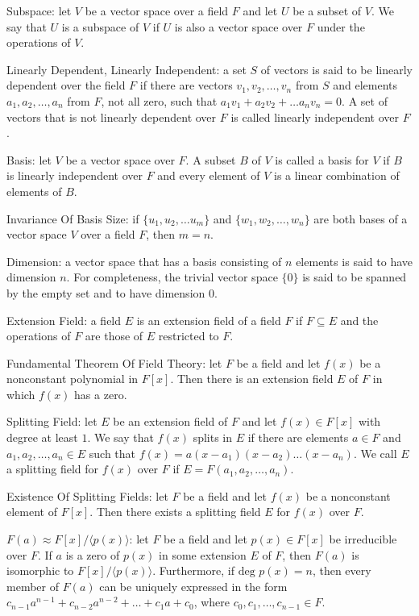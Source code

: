 Subspace: let $V$ be a vector space over a field $F$ and let $U$ be a subset of $V$. We say that $U$ is a subspace of $V$ if $U$ is also a vector space over $F$ under the operations of $V$.

Linearly Dependent, Linearly Independent: a set $S$ of vectors is said to be linearly dependent over the field $F$ if there are vectors $v_1,v_2,\dots,v_n$ from $S$ and elements $a_1,a_2,\dots,a_n$ from $F$, not all zero, such that $a_1 v_1 + a_2 v_2 + \dots a_n v_n = 0$. A set of vectors that is not linearly dependent over $F$ is called linearly independent over $F$.

Basis: let $V$ be a vector space over $F$. A subset $B$ of $V$ is called a basis for $V$ if $B$ is linearly independent over $F$ and every element of $V$ is a linear combination of elements of $B$.

Invariance Of Basis Size: if $\{ u_1,u_2,\dots u_m \}$ and $\{ w_1,w_2,\dots,w_n \}$ are both bases of a vector space $V$ over a field $F$, then $m=n$.

Dimension: a vector space that has a basis consisting of $n$ elements is said to have dimension $n$. For completeness, the trivial vector space $\{ 0 \}$ is said to be spanned by the empty set and to have dimension $0$.

Extension Field: a field $E$ is an extension field of a field $F$ if $F \subseteq E$ and the operations of $F$ are those of $E$ restricted to $F$.

Fundamental Theorem Of Field Theory: let $F$ be a field and let $f(x)$ be a nonconstant polynomial in $F[x]$. Then there is an extension field $E$ of $F$ in which $f(x)$ has a zero.

Splitting Field: let $E$ be an extension field of $F$ and let $f(x) \in F[x]$ with degree at least $1$. We say that $f(x)$ splits in $E$ if there are elements $a \in F$ and $a_1, a_2, \dots,a_n \in E$ such that $f(x)=a(x-a_1)(x-a_2)\dots (x-a_n)$. We call $E$ a splitting field for $f(x)$ over $F$ if $E=F(a_1,a_2,\dots ,a_n)$.

Existence Of Splitting Fields: let $F$ be a field and let $f(x)$ be a nonconstant element of $F[x]$. Then there exists a splitting field $E$ for $f(x)$ over $F$.

$F(a) \approx F[x]/ \langle p(x) \rangle$: let $F$ be a field and let $p(x) \in F[x]$ be irreducible over $F$. If $a$ is a zero of $p(x)$ in some extension $E$ of $F$, then $F(a)$ is isomorphic to $F[x]/ \langle p(x) \rangle$. Furthermore, if $\text{deg }p(x)=n$, then every member of $F(a)$ can be uniquely expressed in the form $c_{n-1} a^{n-1} + c_{n-2} a^{n-2} + \dots + c_1 a + c_0$, where $c_0,c_1,\dots,c_{n-1} \in F$.

